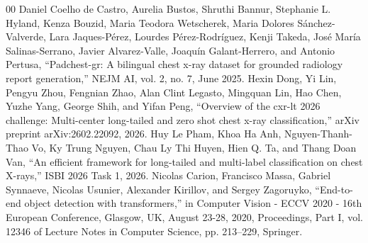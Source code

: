 \documentclass[conference]{IEEEtran}
\begin{document}
\begin{thebibliography}{00}
 Daniel Coelho de Castro, Aurelia Bustos, Shruthi Bannur, Stephanie L. Hyland, Kenza Bouzid, Maria Teodora Wetscherek, Maria Dolores S\'anchez-Valverde, Lara Jaques-P\'erez, Lourdes P\'erez-Rodr\'iguez, Kenji Takeda, Jos\'e Mar\'ia Salinas-Serrano, Javier Alvarez-Valle, Joaqu\'in Galant-Herrero, and Antonio Pertusa, ``Padchest-gr: A bilingual chest x-ray dataset for grounded radiology report generation,'' NEJM AI, vol. 2, no. 7, June 2025.
 Hexin Dong, Yi Lin, Pengyu Zhou, Fengnian Zhao, Alan Clint Legasto, Mingquan Lin, Hao Chen, Yuzhe Yang, George Shih, and Yifan Peng, ``Overview of the cxr-lt 2026 challenge: Multi-center long-tailed and zero shot chest x-ray classification,'' arXiv preprint arXiv:2602.22092, 2026.
 Huy Le Pham, Khoa Ha Anh, Nguyen-Thanh-Thao Vo, Ky Trung Nguyen, Chau Ly Thi Huyen, Hien Q. Ta, and Thang Doan Van, ``An efficient framework for long-tailed and multi-label classification on chest X-rays,'' ISBI 2026 Task 1, 2026.
 Nicolas Carion, Francisco Massa, Gabriel Synnaeve, Nicolas Usunier, Alexander Kirillov, and Sergey Zagoruyko, ``End-to-end object detection with transformers,'' in Computer Vision - ECCV 2020 - 16th European Conference, Glasgow, UK, August 23-28, 2020, Proceedings, Part I, vol. 12346 of Lecture Notes in Computer Science, pp. 213--229, Springer.
\end{thebibliography}
\end{document}
